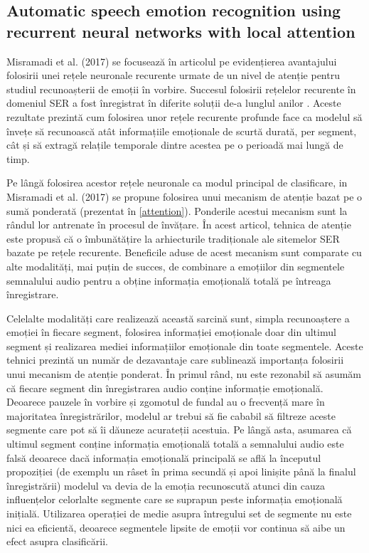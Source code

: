 \documentclass[a4paper,12pt]{book}
\begin{document}
					\subsection{Automatic speech emotion recognition using recurrent neural networks with local attention}
					 \label{prez_misramadi}
					 Misramadi et al. (2017) se focusează în articolul \cite{misramadi} pe evidențierea avantajului folosirii unei rețele neuronale recurente urmate de un nivel de atenție pentru studiul recunoașterii de emoții în vorbire. Succesul folosirii rețelelor recurente în domeniul SER a fost înregistrat în diferite soluții de-a lunglul anilor \cite{yuan,multi-domain,rnn1,rnn2}. Aceste rezultate prezintă cum folosirea unor rețele recurente profunde face ca modelul să învețe să recunoască atât informațiile emoționale de scurtă durată, per segment, cât și să extragă relațile temporale dintre acestea pe o perioadă mai lungă de timp. \par
					 
					 \par 
					 Pe lângă folosirea acestor rețele neuronale ca modul principal de clasificare, in Misramadi et al. (2017) se propune folosirea unui mecanism de atenție bazat pe o sumă ponderată (prezentat în \ref{attention}). Ponderile acestui mecanism sunt la rândul lor antrenate în procesul de învățare. În acest articol, tehnica de atenție este propusă că o îmbunătățire la arhiecturile tradiționale ale sitemelor SER bazate pe rețele recurente. Beneficile aduse de acest mecanism sunt comparate cu alte modalități, mai puțin de succes, de combinare a emoțiilor din segmentele semnalului audio pentru a obține informația emoțională totală pe întreaga înregistrare. \par
					 
					 Celelalte modalități care realizează această sarcină sunt, simpla recunoaștere a emoției în fiecare segment, folosirea informației emoționale doar din ultimul segment și realizarea mediei informațiilor emoționale din toate segmentele. Aceste tehnici prezintă un număr de dezavantaje care sublinează importanța folosirii unui mecanism de atenție ponderat. În primul rând, nu este rezonabil să asumăm că fiecare segment din înregistrarea audio conține informație emoțională. Deoarece pauzele în vorbire și zgomotul de fundal au o frecvență mare în majoritatea înregistrărilor, modelul ar trebui să fie cababil să filtreze aceste segmente care pot să îi dăuneze acurateții acestuia. Pe lângă asta, asumarea că ultimul segment conține informația emoțională totală a semnalului audio este falsă deoarece dacă informația emoțională principală se află la începutul propoziției (de exemplu un râset în prima secundă și apoi linișite până la finalul înregistrării) modelul va devia de la emoția recunoscută atunci din cauza influențelor celorlalte segmente care se suprapun peste informația emoțională inițială. Utilizarea operației de medie asupra întregului set de segmente nu este nici ea eficientă, deoarece segmentele lipsite de emoții vor continua să aibe un efect asupra clasificării. \par
					 
\end{document}
